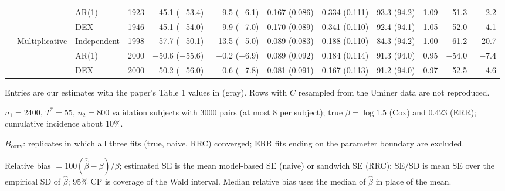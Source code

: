 \documentclass[10pt]{article}
\begin{document}
\begin{table}[ht]
\begin{threeparttable}
\begin{tabular}{lll r rr rr r r rr}
 &  & AR(1) & 1923 & $-$45.1 {\color{gray}($-$53.4)} & 9.5 {\color{gray}($-$6.1)} & 0.167 {\color{gray}(0.086)} & 0.334 {\color{gray}(0.111)} & 93.3 {\color{gray}(94.2)} & 1.09 & $-$51.3 & $-$2.2 \\
 &  & DEX & 1946 & $-$45.1 {\color{gray}($-$54.0)} & 9.9 {\color{gray}($-$7.0)} & 0.170 {\color{gray}(0.089)} & 0.341 {\color{gray}(0.110)} & 92.4 {\color{gray}(94.1)} & 1.05 & $-$52.0 & $-$4.1 \\
\cmidrule(l){2-12}
 & \multirow{3}{*}{Multiplicative} & Independent & 1998 & $-$57.7 {\color{gray}($-$50.1)} & $-$13.5 {\color{gray}($-$5.0)} & 0.089 {\color{gray}(0.083)} & 0.188 {\color{gray}(0.110)} & 84.3 {\color{gray}(94.2)} & 1.00 & $-$61.2 & $-$20.7 \\
 &  & AR(1) & 2000 & $-$50.6 {\color{gray}($-$55.6)} & $-$0.2 {\color{gray}($-$6.9)} & 0.089 {\color{gray}(0.092)} & 0.184 {\color{gray}(0.114)} & 91.3 {\color{gray}(94.0)} & 0.95 & $-$54.0 & $-$7.4 \\
 &  & DEX & 2000 & $-$50.2 {\color{gray}($-$56.0)} & 0.6 {\color{gray}($-$7.8)} & 0.081 {\color{gray}(0.091)} & 0.167 {\color{gray}(0.113)} & 91.2 {\color{gray}(94.0)} & 0.97 & $-$52.5 & $-$4.6 \\
\bottomrule
\end{tabular}
\begin{tablenotes}\footnotesize
\item Entries are our estimates with the paper's Table 1 values in {\color{gray}(gray)}. Rows with $C$ resampled from the Uminer data are not reproduced.
\item $n_1 = 2400$, $T^* = 55$, $n_2 = 800$ validation subjects with 3000 pairs (at most 8 per subject); true $\beta = \log 1.5$ (Cox) and $0.423$ (ERR); cumulative incidence about 10\%.
\item $B_{\mathrm{conv}}$: replicates in which all three fits (true, naive, RRC) converged; ERR fits ending on the parameter boundary are excluded.
\item Relative bias $= 100(\bar{\hat\beta} - \beta)/\beta$; estimated SE is the mean model-based SE (naive) or sandwich SE (RRC); SE/SD is mean SE over the empirical SD of $\hat\beta$; 95\% CP is coverage of the Wald interval. Median relative bias uses the median of $\hat\beta$ in place of the mean.
\end{tablenotes}
\end{threeparttable}
\end{table}
\end{document}
